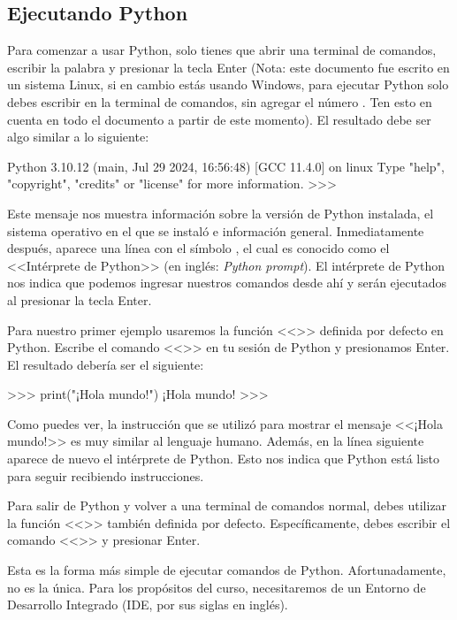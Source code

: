 \subsection{Ejecutando Python}
Para comenzar a usar Python, solo tienes que abrir una terminal de comandos, escribir la palabra  y presionar la tecla Enter (Nota: este documento fue escrito en un sistema Linux, si en cambio estás usando Windows, para ejecutar Python solo debes escribir  en la terminal de comandos, sin agregar el número . Ten esto en cuenta en todo el documento a partir de este momento). El resultado debe ser algo similar a lo siguiente:

\begin{terminal}[pycon]
Python 3.10.12 (main, Jul 29 2024, 16:56:48) [GCC 11.4.0] on linux
Type "help", "copyright", "credits" or "license" for more information.
>>> 
\end{terminal}
Este mensaje nos muestra información sobre la versión de Python instalada, el sistema operativo en el que se instaló e información general. Inmediatamente después, aparece una línea con el símbolo \bashbold{>>>}, el cual es conocido como el <<Intérprete de Python>> (en inglés: \emph{Python prompt}). El intérprete de Python nos indica que podemos ingresar nuestros comandos desde ahí y serán ejecutados al presionar la tecla Enter.

Para nuestro primer ejemplo usaremos la función <<>> definida por defecto en Python. Escribe el comando <<>> en tu sesión de Python y presionamos Enter. El resultado debería ser el siguiente:

\begin{terminal}[pycon]
>>> print("¡Hola mundo!")
¡Hola mundo!
>>> 
\end{terminal}

Como puedes ver, la instrucción que se utilizó para mostrar el mensaje <<¡Hola mundo!>> es muy similar al lenguaje humano. Además, en la línea siguiente aparece de nuevo el intérprete de Python. Esto nos indica que Python está listo para seguir recibiendo instrucciones.

Para salir de Python y volver a una terminal de comandos normal, debes utilizar la función <<>> también definida por defecto. Específicamente, debes escribir el comando <<>> y presionar Enter.

Esta es la forma más simple de ejecutar comandos de Python. Afortunadamente, no es la única. Para los propósitos del curso, necesitaremos de un Entorno de Desarrollo Integrado (IDE, por sus siglas en inglés). 

